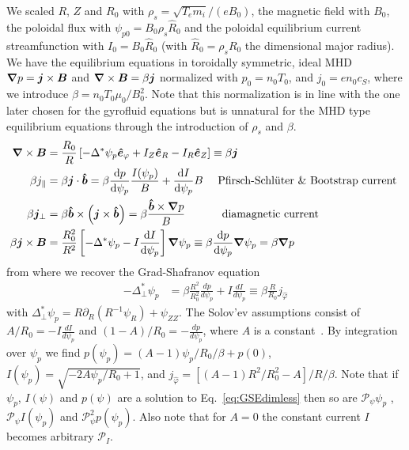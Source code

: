 We scaled $R$, $Z$ and $R_0$ with $\rho_s = \sqrt{T_e m_i}/(eB_0)$, the
magnetic field with $B_0$, the poloidal flux with $\psi_{p0} = B_0\rho_s \hat
R_0$ and the poloidal equilibrium current streamfunction with $I_0 = B_0 \hat R_0$ (with $\hat R_0 =
\rho_s R_0$ the dimensional major radius).
We have the equilibrium equations in toroidally symmetric, ideal MHD
${\boldsymbol{\nabla}} p = {\boldsymbol{j}}\times {\boldsymbol{B}}$ and ${\boldsymbol{\nabla}}\times{\boldsymbol{B}} = \beta {\boldsymbol{j}}$ normalized with $p_0 = n_0 T_0$, and $j_0 = e n_0 c_S$, where we introduce $\beta = n_0 T_0 \mu_0 /B_0^2$.
Note that this normalization is in line with the one later chosen for the gyrofluid
equations but is unnatural for the MHD type equilibrium equations through the introduction
of $\rho_s$ and $\beta$.
\begin{align}
    {\boldsymbol{\nabla}}\times {\boldsymbol{B}} &= \frac{R_0}{R}\left[ -\Delta^*\psi_p\bm{\hat{e}}_\varphi + I_Z \bm{\hat{e}}_R - I_R\bm{\hat{e}}_Z \right]\equiv \beta {\boldsymbol{j}}\\
 \beta j_\parallel &= \beta {\boldsymbol{j}}\cdot \bm{\hat{b}} = \beta \frac{\mathrm{d} p}{\mathrm{d}\psi_p} \frac{I(\psi_p)}{B} +
 \frac{\mathrm{d} I}{\mathrm{d}\psi_p} B \quad \text{  Pfirsch-Schl\"uter \& Bootstrap current } \\
 \beta {\boldsymbol{j}}_\perp &= \beta \bm{\hat{b}}\times\left({\boldsymbol{j}}\times\bm{\hat{b}}\right)=
 \beta \frac{\bm{\hat{b}} \times {\boldsymbol{\nabla}} p}{B} \quad\quad\quad \text{ diamagnetic current} \\
 \beta {\boldsymbol{j}}\times{\boldsymbol{B}} &= \frac{R_0^2}{R^2}\left[ -\Delta^* \psi_p - I
     \frac{\mathrm{d} I}{\mathrm{d} \psi_p} \right]{\boldsymbol{\nabla}}\psi_p \equiv \beta \frac{\mathrm{d} p}{\mathrm{d}\psi_p}{\boldsymbol{\nabla}}\psi_p =\beta {\boldsymbol{\nabla}} p
\end{align}
from where we recover the Grad-Shafranov equation
\begin{align}\label{eq:GSEdimless}
    -\Delta^*_\perp  \psi_p &= \beta \frac{R^2}{R_0^2} \frac{d p}{d  \psi_p } + I \frac{d I}{d  \psi_p } \equiv \beta \frac{R}{R_0} j_{\hat\varphi}
\end{align}
with $\Delta^*_\perp \psi_p = R\partial_R (R^{-1}\psi_R) + \psi_{ZZ}$.
The Solov'ev assumptions consist of \(A/R_0 = -I \frac{d I}{d  \psi_p }\) and \((1-A)/R_0 = -\frac{d p}{d  \psi_p }\), where \(A\) is a constant~\cite{Cerfon2010,Cerfon2014}.
By integration over \(\psi_p\) we find
$
p(\psi_p) = (A-1)\psi_p/R_0/\beta + p(0)$, %
 $I(\psi_p) = \sqrt{-2 A \psi_p/R_0 + 1}$,
 and
    $j_{\hat\varphi} = \left[(A-1)R^2/R_0^2 - A \right]/R/\beta $.
Note that if $\psi_p$, $I(\psi)$ and $p(\psi)$ are a solution to Eq.~\eqref{eq:GSEdimless}
then so are $\mathcal P_\psi \psi_p$ , $\mathcal P_\psi I(\psi_p)$ and $\mathcal P_\psi^2 p(\psi_p)$.
Also note that for $A=0$ the constant current $I$ becomes arbitrary $\mathcal P_I$.

